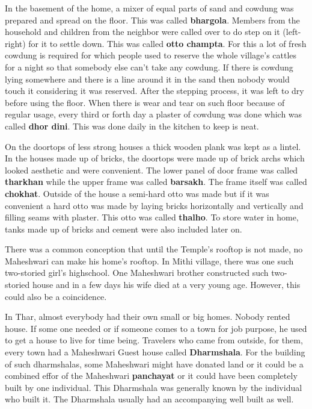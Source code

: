 In the basement of the home, a mixer of equal parts of sand and cowdung was
prepared and spread on the floor. This was called \textbf{bhargola}. Members
from the household and children from the neighbor were called over to do step on
it (left-right) for it to settle down. This was called \textbf{otto champta}.
For this a lot of fresh cowdung is required for which people used to reserve the
whole village's cattles for a night so that somebody else can't take any
cowdung. If there is cowdung lying somewhere and there is a line around it in
the sand then nobody would touch it considering it was reserved. After the
stepping process, it was left to dry before using the floor. When there is wear
and tear on such floor because of regular usage, every third or forth day a
plaster of cowdung was done which was called \textbf{dhor dini}. This was done
daily in the kitchen to keep is neat.

On the doortops of less strong houses a thick wooden plank was kept as a lintel.
In the houses made up of bricks, the doortops were made up of brick archs which
looked aesthetic and were convenient. The lower panel of door frame was called
\textbf{tharkhan} while the upper frame was called \textbf{barsakh}. The frame
itself was called \textbf{chokhat}. Outside of the house a semi-hard otto was
made but if it was convenient a hard otto was made by laying bricks horizontally
and vertically and filling seams with plaster. This otto was called
\textbf{thalho}. To store water in home, tanks made up of bricks and cement were
also included later on.

There was a common conception that until the Temple's rooftop is not made, no
Maheshwari can make his home's rooftop. In Mithi village, there was one such
two-storied girl's highschool. One Maheshwari brother constructed such
two-storied house and in a few days his wife died at a very young age. However,
this could also be a coincidence.

In Thar, almost everybody had their own small or big homes. Nobody rented house.
If some one needed or if someone comes to a town for job purpose, he used to get
a house to live for time being. Travelers who came from outside, for them, every
town had a Maheshwari Guest house called \textbf{Dharmshala}. For the building
of such dharmshalas, some Maheshwari might have donated land or it could be a
combined effor of the Maheshwari \textbf{panchayat} or it could have been
completely built by one individual. This Dharmshala was generally known by the
individual who built it. The Dharmshala usually had an accompanying well built
as well. 


